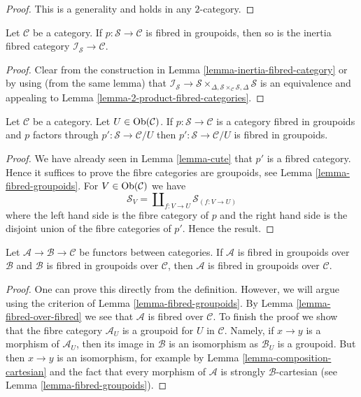 \begin{proof}
This is a generality and holds in any $2$-category.
\end{proof}

\begin{lemma}
\label{lemma-inertia-fibred-groupoids}
Let $\mathcal{C}$ be a category.
If $p : \mathcal{S} \to \mathcal{C}$ is fibred in groupoids, then
so is the inertia fibred category $\mathcal{I}_\mathcal{S} \to \mathcal{C}$.
\end{lemma}

\begin{proof}
Clear from the construction in
Lemma \ref{lemma-inertia-fibred-category}
or by using (from the same lemma) that
$\mathcal{I}_\mathcal{S} \to \mathcal{S}
\times_{\Delta, \mathcal{S} \times_\mathcal{C} \mathcal{S}, \Delta}\mathcal{S}$
is an equivalence and appealing to
Lemma \ref{lemma-2-product-fibred-categories}.
\end{proof}

\begin{lemma}
\label{lemma-cute-groupoids}
Let $\mathcal{C}$ be a category. Let $U \in \mathop{\mathrm{Ob}}\nolimits(\mathcal{C})$.
If $p : \mathcal{S} \to \mathcal{C}$ is a category fibred in groupoids
and $p$ factors through $p' : \mathcal{S} \to \mathcal{C}/U$
then $p' : \mathcal{S} \to \mathcal{C}/U$ is fibred in groupoids.
\end{lemma}

\begin{proof}
We have already seen in Lemma \ref{lemma-cute} that $p'$ is a fibred
category. Hence it suffices to prove the fibre categories are groupoids,
see Lemma \ref{lemma-fibred-groupoids}.
For $V \in \mathop{\mathrm{Ob}}\nolimits(\mathcal{C})$ we have
$$
\mathcal{S}_V = \coprod\nolimits_{f : V \to U} \mathcal{S}_{(f : V \to U)}
$$
where the left hand side is the fibre category of $p$ and the right hand side
is the disjoint union of the fibre categories of $p'$.
Hence the result.
\end{proof}

\begin{lemma}
\label{lemma-fibred-in-groupoids-over-fibred-in-groupoids}
Let $\mathcal{A} \to \mathcal{B} \to \mathcal{C}$ be functors between
categories. If $\mathcal{A}$ is fibred in groupoids over $\mathcal{B}$
and $\mathcal{B}$ is fibred in groupoids over $\mathcal{C}$, then
$\mathcal{A}$ is fibred in groupoids over $\mathcal{C}$.
\end{lemma}

\begin{proof}
One can prove this directly from the definition. However, we will argue
using the criterion of Lemma \ref{lemma-fibred-groupoids}.
By Lemma \ref{lemma-fibred-over-fibred} we see that $\mathcal{A}$
is fibred over $\mathcal{C}$. To finish the proof we show that the fibre
category $\mathcal{A}_U$ is a groupoid for $U$ in $\mathcal{C}$.
Namely, if $x \to y$ is a morphism of $\mathcal{A}_U$, then its
image in $\mathcal{B}$ is an isomorphism as $\mathcal{B}_U$ is
a groupoid. But then $x \to y$ is an isomorphism, for example by
Lemma \ref{lemma-composition-cartesian} and the fact that every
morphism of $\mathcal{A}$ is strongly $\mathcal{B}$-cartesian
(see Lemma \ref{lemma-fibred-groupoids}).
\end{proof}


